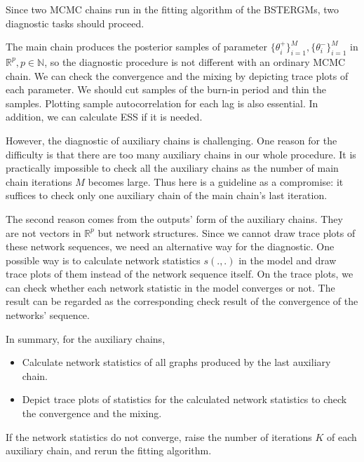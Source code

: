 \documentclass[a4paper, 11pt]{report}
\theoremstyle{definition}
\begin{document}
Since two MCMC chains run in the fitting algorithm of the BSTERGMs, two diagnostic tasks should proceed.

The main chain produces the posterior samples of parameter
$\{\theta_i^+\}_{i=1}^M, \{\theta_i^-\}_{i=1}^M$ in $\mathbb{R}^p, p\in\mathbb{N}$,
so the diagnostic procedure is not different with an ordinary MCMC chain.
We can check the convergence and the mixing by depicting trace plots of each parameter.
We should cut samples of the burn-in period and thin the samples.
Plotting sample autocorrelation for each lag is also essential. In addition, we can calculate ESS if it is needed.

However, the diagnostic of auxiliary chains is challenging. 
One reason for the difficulty is that there are too many auxiliary chains in our whole procedure. 
It is practically impossible to check all the auxiliary chains as the number of main chain iterations $M$ becomes large. 
Thus here is a guideline as a compromise: it suffices to check only one auxiliary chain of the main chain's last iteration. 

The second reason comes from the outputs' form of the auxiliary chains. 
They are not vectors in $\mathbb{R}^p$ but network structures. 
Since we cannot draw trace plots of these network sequences, we need an alternative way for the diagnostic. 
One possible way is to calculate network statistics $s(.,.)$ in the model and 
draw trace plots of them instead of the network sequence itself. 
On the trace plots, we can check whether each network statistic in the model converges or not. 
The result can be regarded as the corresponding check result of the convergence of the networks' sequence.

In summary, for the auxiliary chains,
\begin{itemize}
    \item Calculate network statistics of all graphs produced by the last auxiliary chain.
    \item Depict trace plots of statistics for the calculated network statistics to check the convergence and the mixing.
\end{itemize}
If the network statistics do not converge, raise the number of iterations $K$ of each auxiliary chain,
and rerun the fitting algorithm.
\end{document}
